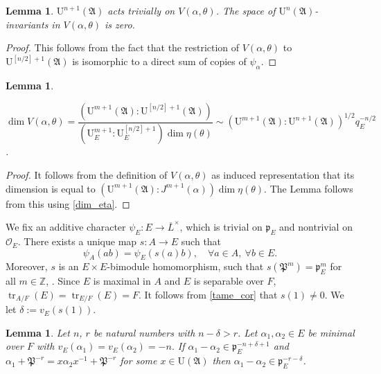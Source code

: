 \documentclass[JEP,XML,SOM,Unicode,NoEqCountersInSection]{cedram}
\let\mathcal\mathscr
\newtheorem{lem}[prop]{Lemma}
\theoremstyle{definition}
\DeclareMathOperator{\tr}{tr}
\newcommand{\ZZ}{\mathbb Z}
\newcommand{\Aa}{\mathfrak A}
\newcommand{\Pp}{\mathfrak P}
\newcommand{\cO}{\mathcal{O}}
\newcommand{\pp}{\mathfrak p}
\newcommand{\UU}{\mathrm U}
\newcommand{\Lbar}{\overline{L}}
\begin{document}
\begin{lem}\label{invariants_super} $\UU^{n+1}(\Aa)$ acts trivially on $V(\alpha, \theta)$. The space of $\UU^n(\Aa)$-invariants in $V(\alpha, \theta)$ is zero.
\end{lem}

\begin{proof} This follows from the fact that the restriction of $V(\alpha, \theta)$ to $\UU^{[n/2]+1}(\Aa)$ is isomorphic to a direct sum of copies of $\psi_{\alpha}$.
\end{proof}

\skpt
\begin{lem}\label{dim_V}\mbox{}\par\vspace*{-10pt}
\centerline{
$\dim V(\alpha, \theta)=\dfrac{( \UU^{m+1}(\Aa): \UU^{[n/2]+1}(\Aa))}{ (\UU^{m+1}_E : \UU^{[n/2]+1}_E)\dim \eta(\theta)}\sim (\UU^{m+1}(\Aa): \UU^{n+1}(\Aa))^{1/2} q_E^{-n/2}$.}
\end{lem}

\begin{proof} It follows from the definition of $V(\alpha, \theta)$ as induced representation that its dimension is equal to $(\UU^{m+1}(\Aa): J^{m+1}(\alpha)) \dim \eta(\theta)$. The Lemma follows from this using \eqref{dim_eta}.
\end{proof}

We fix an additive character $\psi_E: E\to \Lbar^{\times}$, which is trivial on $\pp_E$ and nontrivial on $\cO_E$. There exists a unique map $s: A\to E$ such that
\begin{equation}\label{tame_cor}
\psi_A(ab)= \psi_E(s(a) b), \quad \forall a\in A,\ \forall b\in E.
\end{equation}
Moreover, $s$ is an $E\times E$-bimodule homomorphism, such that $s(\Pp^m)= \pp_E^m$ for all $m\in \ZZ$, \cite[(1.3.4)]{BK}. Since
$E$ is maximal in $A$ and $E$ is separable over $F$, $\tr_{A/F}(E)=\tr_{E/F}(E)=F$. It follows from \eqref{tame_cor} that $s(1)\neq 0$.
We let $\delta:= v_E(s(1))$.

\begin{lem}\label{main_lemma} Let $n$, $r$ be natural numbers with $n-\delta> r$.
Let $\alpha_1,\alpha_2\in E$ be minimal over $F$ with $v_E(\alpha_1)=v_E(\alpha_2)=-n.$ If $\alpha_1 - \alpha_2 \in \pp_E^{-n +\delta+1}$
and $\alpha_1+ \Pp^{-r} = x \alpha_2 x^{-1} + \Pp^{-r}$ for some $x\in \UU(\Aa)$ then $\alpha_1-\alpha_2 \in \pp_E^{-r-\delta}$.
\end{lem}
\end{document}
